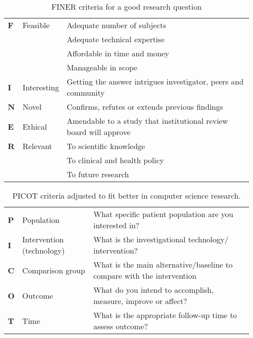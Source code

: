 \begin{table}[]
	\centering
	\caption{FINER criteria for a good research question \cite{Farrugia2009}}
	\label{table:FINER}
	\begin{tabular}{ p{3em} p{6em} p{22em} }
			\textbf{F}	& Feasible & \tabitem Adequate number of subjects \\
			\multicolumn{2}{l}{} & \tabitem Adequate technical expertise \\
			\multicolumn{2}{l}{} & \tabitem Affordable in time and money \\
			\multicolumn{2}{l}{} & \tabitem Manageable in scope \vspace{1em}\\
			\textbf{I}	& Interesting & \tabitem Getting the answer intrigues investigator, peers and community \vspace{1em}\\

			\textbf{N}	& Novel & \tabitem Confirms, refutes or extends previous findings \vspace{1em}\\

			\textbf{E}	& Ethical & \tabitem Amendable to a study that institutional review board will approve \vspace{1em}\\ 
			\textbf{R}	& Relevant & \tabitem To scientific knowledge \\
			\multicolumn{2}{l}{} & \tabitem To clinical and health policy \\
			\multicolumn{2}{l}{} & \tabitem To future research
	\end{tabular}	
\end{table}


\begin{table}[]
	\centering
	\caption{PICOT criteria adjusted to fit better in computer science research.}
	\label{table:PICOT}
	\begin{tabular}{ p{3em} p{6.5em} p{22em} }
		\textbf{P}	& Population & \tabitem What specific patient population are you interested in? \vspace{1em}\\
		
		\textbf{I}	& Intervention (technology) & \tabitem What is the investigational technology/ intervention? \vspace{1em}\\
		
		\textbf{C}	& Comparison group & \tabitem What is the main alternative/baseline to compare with the intervention \vspace{1em}\\ 
		
		\textbf{O}	& Outcome & \tabitem What do you intend to accomplish, measure, improve or affect? \vspace{1em}\\ 
		\textbf{T}	& Time & \tabitem What is the appropriate follow-up time to assess outcome? 
	\end{tabular}
\end{table}



